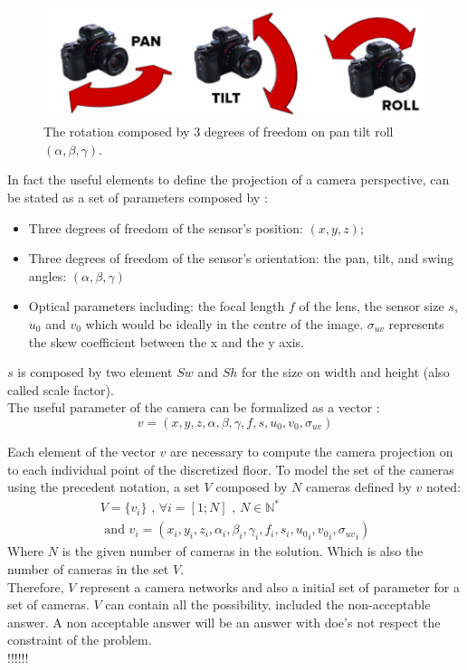  
\begin{figure}[t!]
   \includegraphics[width=\linewidth]{img/PanTiltRoll.png}
  \caption{ The rotation composed by 3 degrees of freedom on pan tilt roll$(\alpha,\beta,\gamma)$.}\label{fig:PanTiltRoll}
  \endminipage\hfill
\end{figure}

In fact the useful elements to define the projection of a camera perspective, can be stated as a set of parameters composed by :\\
\begin{itemize}
\item Three degrees of freedom of the sensor’s position: $(x, y, z)$;
\item Three degrees of freedom of the sensor’s orientation: the pan, tilt, and swing angles: $(\alpha,\beta, \gamma)$ 
\item Optical parameters including: the focal length $f$ of the lens, the sensor size $s$,  $ u_{0}$ and $v_0 $  which would be ideally in the centre of the image. $\sigma_{uv}$ represents the skew coefficient between the x and the y axis.
\end{itemize}
$s$ is composed by two element $Sw$ and $Sh$ for the size on width and height (also called scale factor).\\

The useful parameter of the camera can be formalized as a vector :
\begin{equation}\label{eq:v}
v=(x,y,z,\alpha ,\beta,\gamma,f,s,u_0,v_0,\sigma_{uv})
\end{equation}

Each element of the vector $v$ are necessary to compute the camera projection on to each individual point of the discretized floor. 
\iffalse 
To model the set of the cameras using the precedent notation, a set $V$ composed by $N$ cameras defined by $v$ noted:
\begin{equation}\label{eq:V}
\begin{split}
V= \{v_i\} \mbox{  , } \forall i=[1;N] \mbox{ , } N\in \mathbb{N}^*
\\
\mbox{ and } v_i= (x_i,y_i,z_i,\alpha_i ,\beta_i,\gamma_i,f_i,s_i,{u_0}_i,{v_0}_i,{\sigma_{uv}}_i)
\end{split}
\end{equation}
\noindent Where $N$ is the given number of cameras in the solution. Which is also the number of cameras in the set $V$. \\
Therefore, $V$ represent a camera networks and also a initial set of parameter for a set of cameras. $V$ can contain all the possibility, included the non-acceptable answer. A non acceptable  answer will be an answer with  doe's not respect the constraint of the problem.   
 \\ !!!!!!\\

